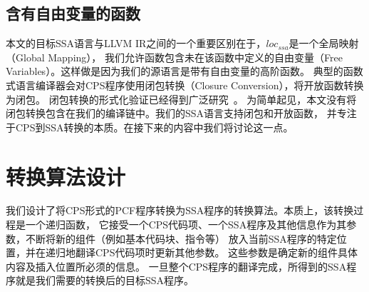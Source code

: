 \subsection{含有自由变量的函数}

本文的目标SSA语言与LLVM IR之间的一个重要区别在于，$loc_{ssa}$是一个全局映射（Global Mapping），
我们允许函数包含未在该函数中定义的自由变量（Free Variables）。这样做是因为我们的源语言是带有自由变量的高阶函数。
典型的函数式语言编译器会对CPS程序使用闭包转换（Closure Conversion），将开放函数转换为闭包。
闭包转换的形式化验证已经得到广泛研究~\cite{paraskevopoulou2019closure,wang-esop2016}。
为简单起见，本文没有将闭包转换包含在我们的编译链中。我们的SSA语言支持闭包和开放函数，
并专注于CPS到SSA转换的本质。在接下来的内容中我们将讨论这一点。

\section{转换算法设计} \label{sec:cpsssatrans}

我们设计了将CPS形式的PCF程序转换为SSA程序的转换算法。本质上，该转换过程是一个递归函数，
它接受一个CPS代码项、一个SSA程序及其他信息作为其参数，不断将新的组件（例如基本代码块、指令等）
放入当前SSA程序的特定位置，并在递归地翻译CPS代码项时更新其他参数。
这些参数是确定新的组件具体内容及插入位置所必须的信息。
一旦整个CPS程序的翻译完成，所得到的SSA程序就是我们需要的转换后的目标SSA程序。

